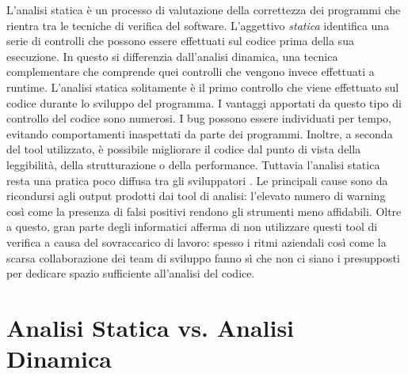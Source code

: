 L'analisi statica è un processo di valutazione della correttezza dei programmi che rientra tra le tecniche di verifica del software. L'aggettivo \textit{statica} identifica una serie di controlli che possono essere effettuati sul codice prima della sua esecuzione. In questo si differenzia dall'analisi dinamica, una tecnica complementare che comprende quei controlli che vengono invece effettuati a runtime.\newline
\indent L'analisi statica solitamente è il primo controllo che viene effettuato sul codice durante lo sviluppo del programma.
I vantaggi apportati da questo tipo di controllo del codice sono numerosi. I bug possono essere individuati per tempo, evitando comportamenti inaspettati da parte dei programmi. Inoltre, a seconda del tool utilizzato, è possibile migliorare il codice dal punto di vista della leggibilità, della strutturazione o della performance.\newline
\indent Tuttavia l'analisi statica resta una pratica poco diffusa tra gli sviluppatori \cite{johnson2013don}. Le principali cause sono da ricondursi agli output prodotti dai tool di analisi: l'elevato numero di warning così come la presenza di falsi positivi rendono gli strumenti meno affidabili. Oltre a questo, gran parte degli informatici afferma di non utilizzare questi tool di verifica a causa del sovraccarico di lavoro: spesso i ritmi aziendali così come la scarsa collaborazione dei team di sviluppo fanno sì che non ci siano i presupposti per dedicare spazio sufficiente all'analisi del codice.\newline


\section{Analisi Statica vs. Analisi Dinamica}


